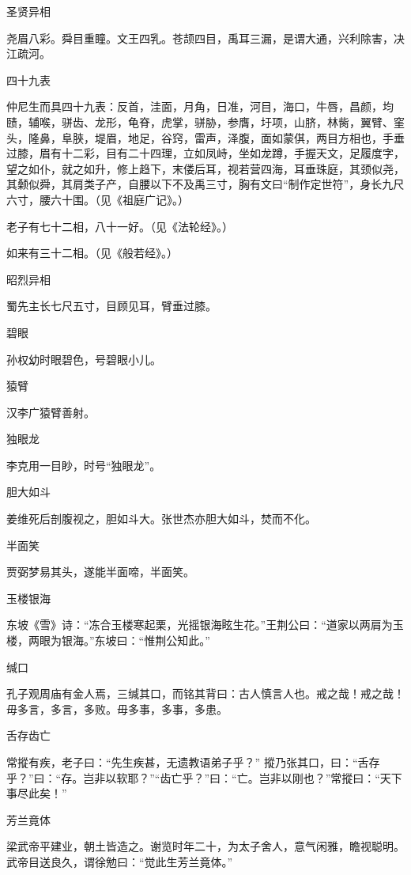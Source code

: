 \documentclass[a4paper,12pt,UTF8,twoside]{ctexbook}
\begin{document}
    圣贤异相
    
    尧眉八彩。舜目重瞳。文王四乳。苍颉四目，禹耳三漏，是谓大通，兴利除害，决江疏河。
    
    四十九表
    
    仲尼生而具四十九表：反首，洼面，月角，日准，河目，海口，牛唇，昌颜，均赜，辅喉，骈齿、龙形，龟脊，虎掌，骈胁，参膺，圩项，山脐，林胔，翼臂、窐头，隆鼻，阜脥，堤眉，地足，谷窍，雷声，泽腹，面如蒙倛，两目方相也，手垂过膝，眉有十二彩，目有二十四理，立如凤峙，坐如龙蹲，手握天文，足履度字，望之如仆，就之如升，修上趋下，末偻后耳，视若营四海，耳垂珠庭，其颈似尧，其颡似舜，其肩类子产，自腰以下不及禹三寸，胸有文曰“制作定世符”，身长九尺六寸，腰六十围。（见《祖庭广记》。）
    
    老子有七十二相，八十一好。（见《法轮经》。）
    
    如来有三十二相。（见《般若经》。）
    
    昭烈异相
    
    蜀先主长七尺五寸，目顾见耳，臂垂过膝。
    
    碧眼
    
    孙权幼时眼碧色，号碧眼小儿。
    
    猿臂
    
    汉李广猿臂善射。
    
    独眼龙
    
    李克用一目眇，时号“独眼龙”。
    
    胆大如斗
    
    姜维死后剖腹视之，胆如斗大。张世杰亦胆大如斗，焚而不化。
    
    半面笑
    
    贾弼梦易其头，遂能半面啼，半面笑。
    
    玉楼银海
    
    东坡《雪》诗：“冻合玉楼寒起栗，光摇银海眩生花。”王荆公曰：“道家以两肩为玉楼，两眼为银海。”东坡曰：“惟荆公知此。”
    
    缄口
    
    孔子观周庙有金人焉，三缄其口，而铭其背曰：古人慎言人也。戒之哉！戒之哉！毋多言，多言，多败。毋多事，多事，多患。
    
    舌存齿亡
    
    常摐有疾，老子曰：“先生疾甚，无遗教语弟子乎？” 摐乃张其口，曰：“舌存乎？”曰：“存。岂非以软耶？”“齿亡乎？”曰：“亡。岂非以刚也？”常摐曰：“天下事尽此矣！”
    
    芳兰竟体
    
    梁武帝平建业，朝土皆造之。谢览时年二十，为太子舍人，意气闲雅，瞻视聪明。武帝目送良久，谓徐勉曰：“觉此生芳兰竟体。”
    
\end{document}
